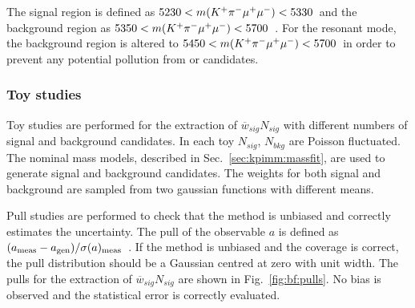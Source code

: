 The signal region is defined as $5230<m({{K}^+}{{\pi}^-}{\mu^+}{\mu^-})<5330$~\mevcc and the background region as $5350<m({{K}^+}{{\pi}^-}{\mu^+}{\mu^-})<5700$~\mevcc. For the resonant mode, the background region is altered to $5450<m({{K}^+}{{\pi}^-}{\mu^+}{\mu^-})<5700$~\mevcc in order to prevent any potential pollution from \BdToJPsiKst or \BsToJPsiKst candidates.

\subsubsection{Toy studies}

Toy studies are performed for the extraction of $\overline{w}_{sig}N_{sig}$ with different numbers of signal and background candidates.  In each toy $N_{sig}$, $N_{bkg}$ are Poisson fluctuated.  The nominal mass models, described in Sec.~\ref{sec:kpimm:massfit}, are used to generate signal and background candidates. The weights for both signal and background are sampled from two gaussian functions with different means. 

Pull studies are performed to check that the method is unbiased and correctly estimates the uncertainty. The pull of the observable $a$ is defined as $(a_{\rm meas}-a_{\rm gen})/\sigma(a)_{\rm meas}$~\cite{lyons-pulls}. If the method is unbiased and the coverage is correct, the pull distribution should be a Gaussian centred at zero with unit width. The pulls for the extraction of $\overline{w}_{sig}N_{sig}$ are shown in Fig.~\ref{fig:bf:pulls}. No bias is observed and the statistical error is correctly evaluated.
 

